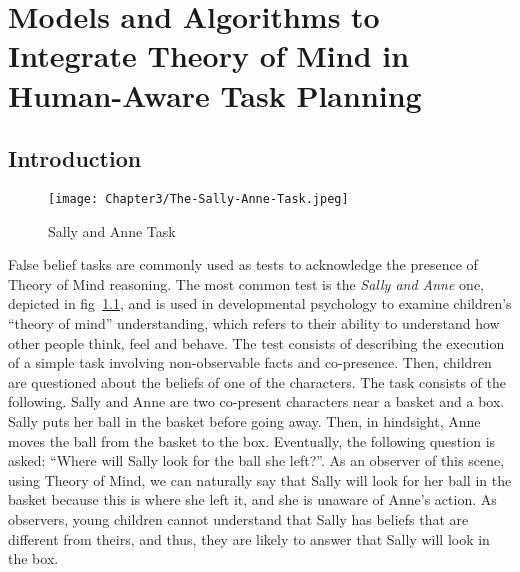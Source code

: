 \ifdefined{}
\else
\setcounter{chapter}{2} %
\dominitoc
\faketableofcontents
\fi

\chapter{Models and Algorithms to Integrate Theory of Mind in Human-Aware Task Planning}
\label{chap:3}
\minitoc


\section{Introduction}



\begin{figure}
    \centering
    \texttt{[image: Chapter3/The-Sally-Anne-Task.jpeg]}
    \caption{Sally and Anne Task}
    \label{fig:sally_and_anne_task}
\end{figure}

False belief tasks are commonly used as tests to acknowledge the presence of Theory of Mind reasoning. The most common test is the \textit{Sally and Anne} one, depicted in fig~\ref{fig:sally_and_anne_task}, and is used in developmental psychology to examine children's ``theory of mind'' understanding, which refers to their ability to understand how other people think, feel and behave. The test consists of describing the execution of a simple task involving non-observable facts and co-presence. Then, children are questioned about the beliefs of one of the characters. The task consists of the following. Sally and Anne are two co-present characters near a basket and a box. Sally puts her ball in the basket before going away. Then, in hindsight, Anne moves the ball from the basket to the box. Eventually, the following question is asked: ``Where will Sally look for the ball she left?''. As an observer of this scene, using Theory of Mind, we can naturally say that Sally will look for her ball in the basket because this is where she left it, and she is unaware of Anne's action. As observers, young children cannot understand that Sally has beliefs that are different from theirs, and thus, they are likely to answer that Sally will look in the box. 

